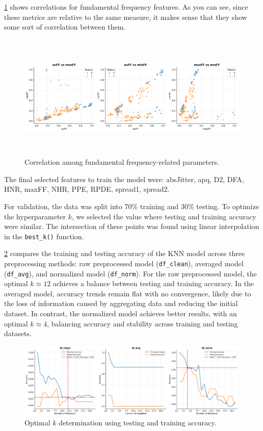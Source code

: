 \cref{fig:fig2} shows correlations for fundamental frequency features. As you
can see, since these metrics are relative to the same measure, it makes sense
that they show some sort of correlation between them.

\begin{figure}[H]
	\centering
	\includegraphics[width=0.99\textwidth,height=6cm]{../images/feature_selection/fundamental_frequency.png}
	\caption{Correlation among fundamental frequency-related parameters.}
	\label{fig:fig2}
\end{figure}

The final selected features to train the model were: absJitter, apq, D2, DFA,
HNR, maxFF, NHR, PPE, RPDE, spread1, spread2.

For validation, the data was split into 70\% training and 30\% testing. To
optimize the hyperparameter \(k\), we selected the value where testing and
training accuracy were similar. The intersection of these points was found
using linear interpolation in the \texttt{best\_k()} function.

\cref{fig:fig3} compares the training and testing accuracy of the KNN model
across three preprocessing methods: raw preprocessed model
(\texttt{df\_clean}), averaged model (\texttt{df\_avg}), and normalized model
(\texttt{df\_norm}). For the raw preprocessed model, the optimal \(k \approx
12\) achieves a balance between testing and training accuracy. In the averaged
model, accuracy trends remain flat with no convergence, likely due to the loss
of information caused by aggregating data and reducing the initial dataset. In
contrast, the normalized model achieves better results, with an optimal \(k
\approx 4\), balancing accuracy and stability across training and testing
datasets.

\begin{figure}[H]
	\centering
	\includegraphics[width=0.99\textwidth]{../images/feature_selection/best_k.png}
	\caption{Optimal \(k\) determination using testing and training accuracy.}
	\label{fig:fig3}
\end{figure}

